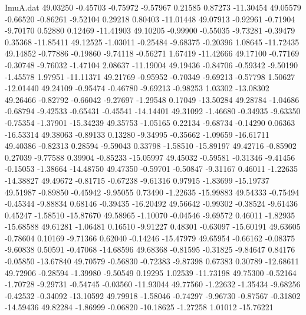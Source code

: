 \begin{filecontents}{ImuA.dat}
  49.03250   -0.45703   -0.75972   -9.57967    0.21585    0.87273  -11.30454
  49.05579   -0.66520   -0.86261   -9.52104    0.29218    0.80403  -11.01448
  49.07913   -0.92961   -0.71904   -9.70170    0.52880    0.12469  -11.41903
  49.10205   -0.99900   -0.55035   -9.73281   -0.39479    0.35368  -11.85411
  49.12525   -1.03011   -0.25484   -9.68375   -0.20396    1.08645  -11.72435
  49.14852   -0.77886   -0.19860   -9.74118   -0.56271    1.67419  -11.42666
  49.17100   -0.77169   -0.30748   -9.76032   -1.47104    2.08637  -11.19004
  49.19436   -0.84706   -0.59342   -9.50190   -1.45578    1.97951  -11.11371
  49.21769   -0.95952   -0.70349   -9.69213   -0.57798    1.50627  -12.01440
  49.24109   -0.95474   -0.46780   -9.69213   -0.98253    1.03302  -13.08302
  49.26466   -0.82792   -0.66042   -9.27697   -1.29548    0.17049  -13.50284
  49.28784   -1.04686   -0.68794   -9.42533   -0.65431   -0.45541  -14.14401
  49.31092   -1.46680   -0.34935   -9.63350   -0.75354   -1.37901  -15.34239
  49.35753   -1.05165    0.22134   -9.68734   -0.14290    0.06363  -16.53314
  49.38063   -0.89133    0.13280   -9.34995   -0.35662   -1.09659  -16.61711
  49.40386   -0.82313    0.28594   -9.59043    0.33798   -1.58510  -15.89197
  49.42716   -0.85902    0.27039   -9.77588    0.39904   -0.85233  -15.05997
  49.45032   -0.59581   -0.31346   -9.41456   -0.15053   -1.38664  -14.48750
  49.47350   -0.59701   -0.50847   -9.31167    0.46011   -1.22635  -14.38827
  49.49672   -0.81715   -0.67238   -9.61316    0.97915   -1.83699  -15.19737
  49.51987   -0.89850   -0.45942   -9.95055    0.73490   -1.22635  -15.99883
  49.54333   -0.75494   -0.45344   -9.88834    0.68146   -0.39435  -16.20492
  49.56642   -0.99302   -0.38524   -9.61436    0.45247   -1.58510  -15.87670
  49.58965   -1.10070   -0.04546   -9.69572    0.46011   -1.82935  -15.68588
  49.61281   -1.06481    0.16510   -9.91227    0.48301   -0.63097  -15.60191
  49.63605   -0.78604    0.10169   -9.71366    0.62040   -0.14246  -15.47979
  49.65954   -0.66162   -0.08375   -9.60838    0.50591   -0.47068  -14.68596
  49.68368   -0.81595   -0.31825   -9.84647    0.84176   -0.05850  -13.67840
  49.70579   -0.56830   -0.72383   -9.87398    0.67383    0.30789  -12.68611
  49.72906   -0.28594   -1.39980   -9.50549    0.19295    1.02539  -11.73198
  49.75300   -0.52164   -1.70728   -9.29731   -0.54745   -0.03560  -11.93044
  49.77560   -1.22632   -1.35434   -9.68256   -0.42532   -0.34092  -13.10592
  49.79918   -1.58046   -0.74297   -9.96730   -0.87567   -0.31802  -14.59436
  49.82284   -1.86999   -0.06820  -10.18625   -1.27258    1.01012  -15.76221

\end{filecontents}
